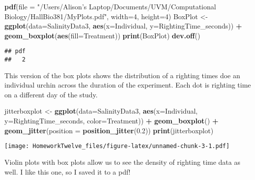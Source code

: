 \documentclass[
]{article}
\newenvironment{Shaded}{\begin{snugshade}}{\end{snugshade}}
\newcommand{\DataTypeTok}[1]{\textcolor[rgb]{0.13,0.29,0.53}{#1}}
\newcommand{\DecValTok}[1]{\textcolor[rgb]{0.00,0.00,0.81}{#1}}
\newcommand{\FloatTok}[1]{\textcolor[rgb]{0.00,0.00,0.81}{#1}}
\newcommand{\KeywordTok}[1]{\textcolor[rgb]{0.13,0.29,0.53}{\textbf{#1}}}
\newcommand{\NormalTok}[1]{#1}
\newcommand{\OperatorTok}[1]{\textcolor[rgb]{0.81,0.36,0.00}{\textbf{#1}}}
\newcommand{\StringTok}[1]{\textcolor[rgb]{0.31,0.60,0.02}{#1}}
\begin{document}
\begin{Shaded}
\begin{Highlighting}[]
\KeywordTok{pdf}\NormalTok{(}\DataTypeTok{file =} \StringTok{"/Users/Alison's Laptop/Documents/UVM/Computational Biology/HallBio381/MyPlots.pdf"}\NormalTok{, }\DataTypeTok{width=}\DecValTok{4}\NormalTok{, }\DataTypeTok{height=}\DecValTok{4}\NormalTok{)}
\NormalTok{BoxPlot <-}\StringTok{ }\KeywordTok{ggplot}\NormalTok{(}\DataTypeTok{data=}\NormalTok{SalinityData3, }\KeywordTok{aes}\NormalTok{(}\DataTypeTok{x=}\NormalTok{Individual, }\DataTypeTok{y=}\NormalTok{RightingTime_seconds)) }\OperatorTok{+}\StringTok{ }\KeywordTok{geom_boxplot}\NormalTok{(}\KeywordTok{aes}\NormalTok{(}\DataTypeTok{fill=}\NormalTok{Treatment))}
\KeywordTok{print}\NormalTok{(BoxPlot)}
\KeywordTok{dev.off}\NormalTok{()}
\end{Highlighting}
\end{Shaded}

\begin{verbatim}
## pdf 
##   2
\end{verbatim}

This version of the box plots shows the distribution of a righting times
doe an individual urchin across the duration of the experiment. Each dot
is righting time on a different day of the study.

\begin{Shaded}
\begin{Highlighting}[]
\NormalTok{jitterboxplot <-}\StringTok{ }\KeywordTok{ggplot}\NormalTok{(}\DataTypeTok{data=}\NormalTok{SalinityData3, }\KeywordTok{aes}\NormalTok{(}\DataTypeTok{x=}\NormalTok{Individual, }\DataTypeTok{y=}\NormalTok{RightingTime_seconds, }\DataTypeTok{color=}\NormalTok{Treatment)) }\OperatorTok{+}
\StringTok{  }\KeywordTok{geom_boxplot}\NormalTok{() }\OperatorTok{+}\StringTok{ }\KeywordTok{geom_jitter}\NormalTok{(}\DataTypeTok{position =} \KeywordTok{position_jitter}\NormalTok{(}\FloatTok{0.2}\NormalTok{))}
\KeywordTok{print}\NormalTok{(jitterboxplot)}
\end{Highlighting}
\end{Shaded}

\texttt{[image: HomeworkTwelve\_files/figure-latex/unnamed-chunk-3-1.pdf]}

Violin plots with box plots allow us to see the density of righting time
data as well. I like this one, so I saved it to a pdf!
\end{document}

